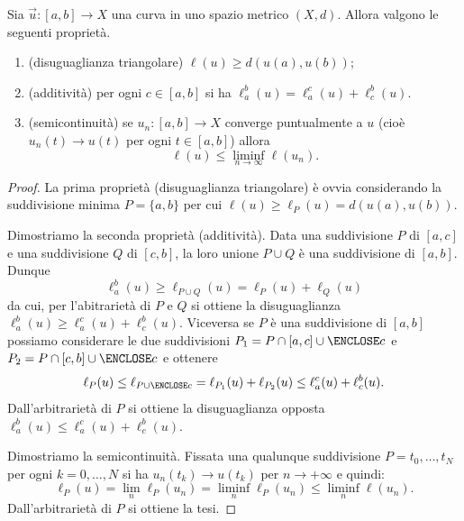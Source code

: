\begin{theorem}
Sia $\vec u \colon [a,b] \to X$ una curva in uno spazio metrico $(X,d)$.
Allora valgono le seguenti proprietà.
\begin{enumerate}
\item (disuguaglianza triangolare) $\ell(u) \ge d(u(a), u(b))$;
\item (additività) per ogni $c\in [a,b]$ si ha 
  $\ell_a^b(u) = \ell_a^c(u) + \ell_c^b(u)$.
\item (semicontinuità)
se $u_n\colon [a,b] \to X$ converge puntualmente a $u$
(cioè $u_n(t) \to u(t)$ per ogni $t\in[a,b]$)
allora 
\[
  \ell(u) \le \liminf_{n\to \infty} \ell(u_n).
\]
\end{enumerate}
\end{theorem}
\begin{proof}
La prima proprietà (disuguaglianza triangolare) è ovvia 
considerando la suddivisione minima $P = \{ a,b\}$ 
per cui $\ell(u) \ge \ell_P(u) = d(u(a), u(b))$.

Dimostriamo la seconda proprietà (additività).
Data una suddivisione $P$ di $[a,c]$ e una suddivisione $Q$ di $[c,b]$,
la loro unione $P\cup Q$ è una suddivisione di $[a,b]$. Dunque 
\[
    \ell_a^b(u) \ge \ell_{P\cup Q}(u) = \ell_{P}(u) + \ell_{Q}(u)
\] 
da cui, per l'abitrarietà di $P$ e $Q$ si ottiene 
la disuguaglianza $\ell_a^b(u) \ge \ell_a^c(u) + \ell_c^b(u)$.
Viceversa se $P$ è una suddivisione di $[a,b]$ possiamo 
considerare le due suddivisioni $P_1 = P \cap [a,c] \cup \ENCLOSE c$ e
$P_2 = P \cap [c,b] \cup \ENCLOSE c$ 
e ottenere 
\[
\ell_P(u) \le \ell_{P\cup\ENCLOSE c} 
= \ell_{P_1}(u) + \ell_{P_2}(u) 
\le \ell_a^c(u) + \ell_c^b(u).
\]
Dall'arbitrarietà di $P$ si ottiene la disuguaglianza opposta
$\ell_a^b(u) \le \ell_a^c(u) + \ell_c^b(u)$.

Dimostriamo la semicontinuità.
Fissata una qualunque suddivisione $P={t_0,\dots, t_N}$
per ogni $k=0,\dots, N$ si ha $u_n(t_k)\to u(t_k)$ per $n\to +\infty$ e quindi:
\[
  \ell_P(u) =
  \lim_n \ell_P(u_n)
  = \liminf_n \ell_P(u_n)
  \le \liminf_n \ell(u_n).
\]
Dall'arbitrarietà di $P$ si ottiene la tesi.
\end{proof}

